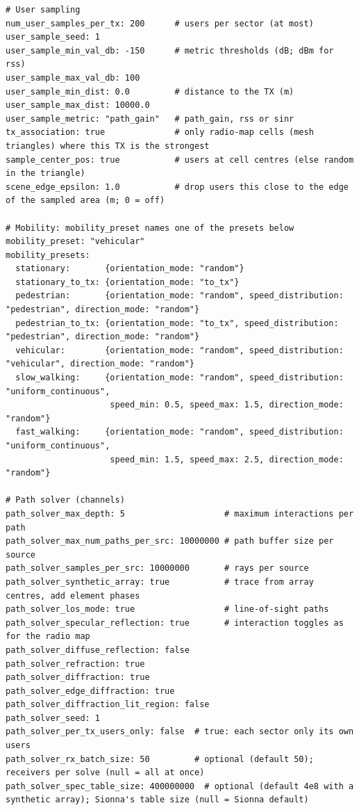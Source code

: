 \documentclass{article}
\begin{document}
\begin{verbatim}
# User sampling
num_user_samples_per_tx: 200      # users per sector (at most)
user_sample_seed: 1
user_sample_min_val_db: -150      # metric thresholds (dB; dBm for rss)
user_sample_max_val_db: 100
user_sample_min_dist: 0.0         # distance to the TX (m)
user_sample_max_dist: 10000.0
user_sample_metric: "path_gain"   # path_gain, rss or sinr
tx_association: true              # only radio-map cells (mesh triangles) where this TX is the strongest
sample_center_pos: true           # users at cell centres (else random in the triangle)
scene_edge_epsilon: 1.0           # drop users this close to the edge of the sampled area (m; 0 = off)

# Mobility: mobility_preset names one of the presets below
mobility_preset: "vehicular"
mobility_presets:
  stationary:       {orientation_mode: "random"}
  stationary_to_tx: {orientation_mode: "to_tx"}
  pedestrian:       {orientation_mode: "random", speed_distribution: "pedestrian", direction_mode: "random"}
  pedestrian_to_tx: {orientation_mode: "to_tx", speed_distribution: "pedestrian", direction_mode: "random"}
  vehicular:        {orientation_mode: "random", speed_distribution: "vehicular", direction_mode: "random"}
  slow_walking:     {orientation_mode: "random", speed_distribution: "uniform_continuous",
                     speed_min: 0.5, speed_max: 1.5, direction_mode: "random"}
  fast_walking:     {orientation_mode: "random", speed_distribution: "uniform_continuous",
                     speed_min: 1.5, speed_max: 2.5, direction_mode: "random"}

# Path solver (channels)
path_solver_max_depth: 5                    # maximum interactions per path
path_solver_max_num_paths_per_src: 10000000 # path buffer size per source
path_solver_samples_per_src: 10000000       # rays per source
path_solver_synthetic_array: true           # trace from array centres, add element phases
path_solver_los_mode: true                  # line-of-sight paths
path_solver_specular_reflection: true       # interaction toggles as for the radio map
path_solver_diffuse_reflection: false
path_solver_refraction: true
path_solver_diffraction: true
path_solver_edge_diffraction: true
path_solver_diffraction_lit_region: false
path_solver_seed: 1
path_solver_per_tx_users_only: false  # true: each sector only its own users
path_solver_rx_batch_size: 50         # optional (default 50); receivers per solve (null = all at once)
path_solver_spec_table_size: 400000000  # optional (default 4e8 with a synthetic array); Sionna's table size (null = Sionna default)


\end{verbatim}
\end{document}
